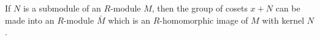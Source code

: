 If $N$ is a submodule of an $R$-module $M$, then the group of cosets $x + N$ can be made into an $R$-module $\bar{M}$ which is an $R$-homomorphic image of $M$ with kernel $N$.
